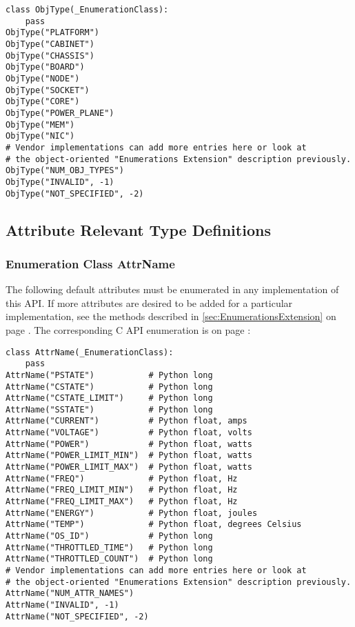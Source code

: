 \begin{center}\begin{minipage}{.95\linewidth}\begin{lstlisting}
class ObjType(_EnumerationClass):
    pass
ObjType("PLATFORM")
ObjType("CABINET")
ObjType("CHASSIS")
ObjType("BOARD")
ObjType("NODE")
ObjType("SOCKET")
ObjType("CORE")
ObjType("POWER_PLANE")
ObjType("MEM")
ObjType("NIC")
# Vendor implementations can add more entries here or look at  
# the object-oriented "Enumerations Extension" description previously. 
ObjType("NUM_OBJ_TYPES")
ObjType("INVALID", -1)
ObjType("NOT_SPECIFIED", -2)
\end{lstlisting}\end{minipage}\end{center}

\subsection{Attribute Relevant Type Definitions}
\label{sec:PythonAttributeRelevantTypeDefinitions}

\subsubsection{Enumeration Class AttrName}\label{class:AttrName}

The following default attributes must be enumerated in any implementation of
this API. If more attributes are desired to be added for a particular
implementation, see the methods described in \ref{sec:EnumerationsExtension} on
page \pageref{sec:EnumerationsExtension}. The corresponding C API enumeration
is on page \pageref{type:AttrName}:

\begin{center}\begin{minipage}{.95\linewidth}\begin{lstlisting}
class AttrName(_EnumerationClass):
    pass
AttrName("PSTATE")           # Python long
AttrName("CSTATE")           # Python long
AttrName("CSTATE_LIMIT")     # Python long
AttrName("SSTATE")           # Python long
AttrName("CURRENT")          # Python float, amps
AttrName("VOLTAGE")          # Python float, volts
AttrName("POWER")            # Python float, watts
AttrName("POWER_LIMIT_MIN")  # Python float, watts
AttrName("POWER_LIMIT_MAX")  # Python float, watts
AttrName("FREQ")             # Python float, Hz
AttrName("FREQ_LIMIT_MIN")   # Python float, Hz
AttrName("FREQ_LIMIT_MAX")   # Python float, Hz
AttrName("ENERGY")           # Python float, joules 
AttrName("TEMP")             # Python float, degrees Celsius
AttrName("OS_ID")            # Python long
AttrName("THROTTLED_TIME")   # Python long
AttrName("THROTTLED_COUNT")  # Python long
# Vendor implementations can add more entries here or look at  
# the object-oriented "Enumerations Extension" description previously. 
AttrName("NUM_ATTR_NAMES")
AttrName("INVALID", -1)
AttrName("NOT_SPECIFIED", -2)
\end{lstlisting}\end{minipage}\end{center}


